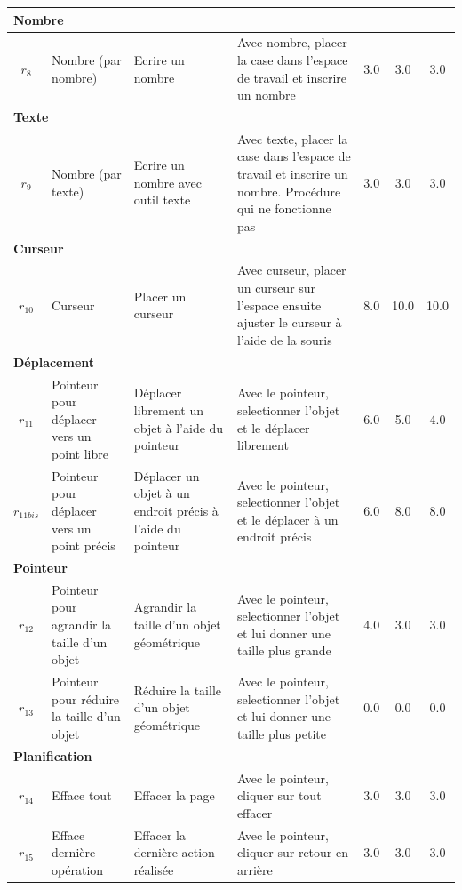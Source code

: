 \begin{longtable}{|c|p{3cm}|p{4cm}|p{4cm}|c|c|c|}
\multicolumn{7}{|l|}{\textbf{Nombre}} \\ \hline
$r_{8}$\label{op_nbre} & Nombre (par nombre) & Ecrire un nombre & Avec nombre, placer la case dans l'espace de travail et inscrire un nombre & 3.0 & 3.0 & 3.0 \\ \hline
\multicolumn{7}{|l|}{\textbf{Texte}} \\ \hline
$r_{9}$\label{op_nbre_txt} & Nombre (par texte) & Ecrire un nombre avec outil texte & Avec texte, placer la case dans l'espace de travail et inscrire un nombre. Procédure qui ne fonctionne pas & 3.0 & 3.0 & 3.0 \\ \hline
\multicolumn{7}{|l|}{\textbf{Curseur}} \\ \hline
$r_{10}$\label{op_curseur} & Curseur & Placer un curseur & Avec curseur, placer un curseur sur l'espace ensuite ajuster le curseur à l'aide de la souris & 8.0 & 10.0 & 10.0 \\ \hline
\multicolumn{7}{|l|}{\textbf{Déplacement}} \\ \hline
$r_{11}$\label{op_pointeur_depl_lib} & Pointeur pour déplacer vers un point libre & Déplacer  librement un objet à l’aide du pointeur & Avec le pointeur, selectionner l'objet et le déplacer librement & 6.0 & 5.0 & 4.0 \\ \hline
$r_{11bis}$\label{op_pointeur_depl_prec} & Pointeur pour déplacer vers un point précis & Déplacer un objet  à un endroit précis à l’aide du pointeur & Avec le pointeur, selectionner l'objet et le déplacer à un endroit précis & 6.0 & 8.0 & 8.0 \\ \hline
\multicolumn{7}{|l|}{\textbf{Pointeur}} \\ \hline
$r_{12}$\label{op_pointeur_agran} & Pointeur pour agrandir la taille d’un objet & Agrandir la taille d’un objet géométrique & Avec le pointeur, selectionner l'objet et lui donner une taille plus grande & 4.0 & 3.0 & 3.0 \\ \hline
$r_{13}$\label{op_pointeur_reduire} & Pointeur pour réduire la taille d’un objet & Réduire la taille d’un objet géométrique & Avec le pointeur, selectionner l'objet et lui donner une taille plus petite & 0.0 & 0.0 & 0.0 \\ \hline
\multicolumn{7}{|l|}{\textbf{Planification}} \\ \hline
$r_{14}$\label{op_dlt_all} & Efface tout & Effacer la page & Avec le pointeur, cliquer sur tout effacer & 3.0 & 3.0 & 3.0 \\ \hline
$r_{15}$\label{op_dlt_one} & Efface dernière opération & Effacer la dernière action réalisée & Avec le pointeur, cliquer sur retour en arrière & 3.0 & 3.0 & 3.0 \\ \hline

\end{longtable}

